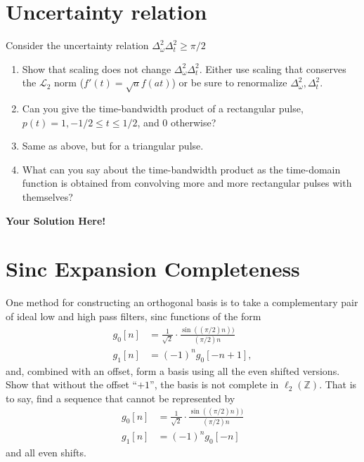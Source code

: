 \documentclass[12pt]{article}
\newcommand{\0}{\mathbf{0}}
\newcommand{\1}{\mathbf{1}}
\newcommand{\solspace}{\vspace{3mm} \textbf{Your Solution Here!} \vspace{3mm}}
\begin{document}
\rhead{\today}
 
\section{Uncertainty relation}
Consider the uncertainty relation $\Delta_\omega^2 \Delta_t^2 \geq \pi/2$
\begin{enumerate}
    \item Show that scaling does not change $\Delta_\omega^2 \Delta_t^2$. Either use scaling that conserves the $\mathcal{L}_2$ norm ($f'(t) = \sqrt{a}f(a t)$) or be sure to renormalize $\Delta_\omega^2, \Delta_t^2$.
    \item Can you give the time-bandwidth product of a rectangular pulse, $p(t) = 1, -1/2 \leq t \leq 1/2$, and 0 otherwise?
    \item Same as above, but for a triangular pulse.
    \item What can you say about the time-bandwidth product as the time-domain function is obtained from convolving more and more rectangular pulses with themselves?
\end{enumerate}

\solspace

\pagebreak

\section{Sinc Expansion Completeness}

One method for constructing an orthogonal basis is to take a complementary pair of ideal low and high pass filters, sinc functions of the form
\begin{align*}
    g_0[n] &= \frac{1}{\sqrt{2}}\cdot\frac{\sin((\pi/2)n))}{(\pi/2) n} \\
    g_1[n] &= (-1)^n g_0[-n+1],
\end{align*}
and, combined with an offset, form a basis using all the even shifted  versions.
Show that without the offset ``$+1$'', the basis is not complete in $\ell_2(\mathbb{Z})$. That is to say, find a sequence that cannot be represented by
\begin{align*}
    g_0[n] &= \frac{1}{\sqrt{2}}\cdot\frac{\sin((\pi/2)n))}{(\pi/2) n} \\
    g_1[n] &= (-1)^n g_0[-n]
\end{align*}
and all even shifts.
\end{document}
